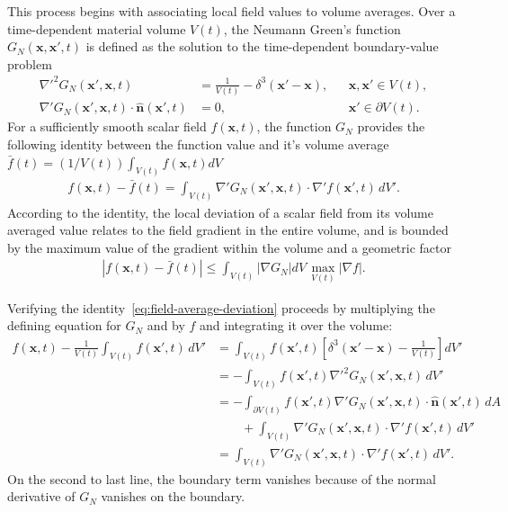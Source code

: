 This process begins with associating local field values to volume averages. Over a time-dependent material volume $V(t)$, the Neumann Green's function $G_N(\bm{x},\bm{x}',t)$ is defined as the solution to the time-dependent boundary-value problem
\begin{align}
    \nabla'^2G_N(\bm{x}',\bm{x},t)
    &=
    \frac{1}{V(t)}-\delta^3(\bm{x}'-\bm{x}),
    &&
    \bm{x},\bm{x}'\in V(t),\\
    \nabla'G_N(\bm{x}',\bm{x},t)\cdot\bm{\hat n}(\bm{x}',t)
    &=0,
    &&
    \bm{x}'\in\partial V(t).
\end{align}
For a sufficiently smooth scalar field $f(\bm{x},t)$, the function $G_N$ provides the following identity between the function value and it's volume average $\bar{f}(t)=(1/V(t))\int_{V(t)}f(\bm{x},t)dV$
\begin{align}
    f(\bm{x},t)-\bar{f}(t)
    =
    \int_{V(t)}
    \nabla'G_N(\bm{x}',\bm{x},t)
    \cdot
    \nabla'f(\bm{x}',t)\,dV'.
    \label{eq:field-average-deviation}
\end{align}
According to the identity, the local deviation of a scalar field from its volume averaged value relates to the field gradient in the entire volume, and is bounded by the maximum value of the gradient within the volume and a geometric factor
\begin{align}
    |f(\bm{x},t)-\bar{f}(t)|\leq \int_{V(t)}|\nabla G_N|dV\,\max_{V(t)}|\nabla f|.
\end{align}
\begin{example}
    Verifying the identity~\eqref{eq:field-average-deviation} proceeds by multiplying the defining equation for $G_N$ and by $f$ and integrating it over the volume:
    \begin{align*}
        f(\bm{x},t)-\frac{1}{V(t)}
        \int_{V(t)}f(\bm{x}',t)\,dV'
        &=
        \int_{V(t)}
        f(\bm{x}',t)
        \left[
            \delta^3(\bm{x}'-\bm{x})-\frac{1}{V(t)}
        \right]dV'\\
        &=
        -\int_{V(t)}
        f(\bm{x}',t)
        \nabla'^2G_N(\bm{x}',\bm{x},t)\,dV'\\
        &=
        -\int_{\partial V(t)}
        f(\bm{x}',t)
        \nabla'G_N(\bm{x}',\bm{x},t)
        \cdot\bm{\hat n}(\bm{x}',t)\,dA\\
        &\qquad
        +\int_{V(t)}
        \nabla'G_N(\bm{x}',\bm{x},t)
        \cdot\nabla'f(\bm{x}',t)\,dV'\\
        &=
        \int_{V(t)}
        \nabla'G_N(\bm{x}',\bm{x},t)
        \cdot\nabla'f(\bm{x}',t)\,dV'.
    \end{align*}
    On the second to last line, the boundary term vanishes because of the normal derivative of $G_N$ vanishes on the boundary.
\end{example}

